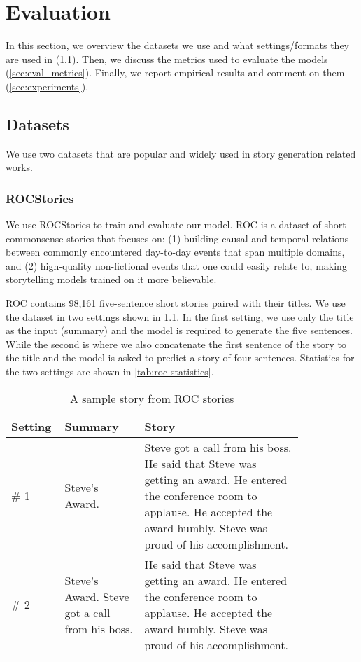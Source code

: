\chapter{Evaluation}
\label{ch:evaluation}


In this section, we overview the datasets we use and what settings/formats they are used in (\cref{sec:datasets}). Then, we discuss the metrics used to evaluate the models (\cref{sec:eval_metrics}). Finally, we report empirical results and comment on them (\cref{sec:experiments}).

\section{Datasets}
\label{sec:datasets}

We use two datasets that are popular and widely used in story generation related works.

\subsection{ROCStories}
\label{sec:roc_stories}

We use ROCStories \cite[ROC]{mostafazadeh2016corpus} to train and evaluate our model. ROC is a dataset of short commonsense stories that focuses on: (1) building causal and temporal relations between commonly encountered day-to-day events that span multiple domains, and (2) high-quality non-fictional events that one could easily relate to, making storytelling models trained on it more believable.

ROC contains 98,161 five-sentence short stories paired with their titles. We use the dataset in two settings shown in \cref{tab:roc-samples}. In the first setting, we use only the title as the input (summary) and the model is required to generate the five sentences. While the second is where we also concatenate the first sentence of the story to the title and the model is asked to predict a story of four sentences. Statistics for the two settings are shown in \cref{tab:roc-statistics}.

\begin{table}[ht]
\centering
\begin{tabular}{p{0.08\linewidth} | p{0.25\linewidth} | p{0.5\linewidth}}
Setting & Summary  & Story \\ \hline
\# 1 & Steve's Award. & Steve got a call from his boss. He said that Steve was getting an award. He entered the conference room to applause. He accepted the award humbly. Steve was proud of his accomplishment. \\ \hline

\# 2 & Steve's Award. Steve got a call from his boss. & He said that Steve was getting an award. He entered the conference room to applause. He accepted the award humbly. Steve was proud of his accomplishment. \\
\end{tabular}
\caption{A sample story from ROC stories%
}
\label{tab:roc-samples}
\end{table}

